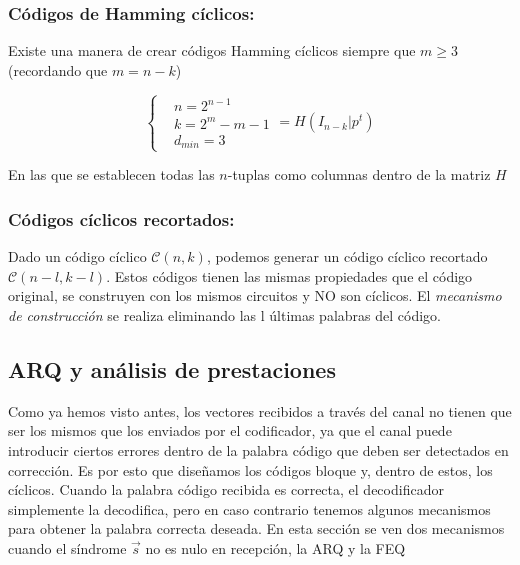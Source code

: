 \documentclass{article}
\begin{document}
\subsubsection{Códigos de Hamming cíclicos:}

Existe una manera de crear códigos Hamming cíclicos siempre que $m \geq 3$ (recordando que $m = n-k$) 

\begin{equation}
    \left\{
    \begin{aligned}
        &n=2^{n-1}\\
        &k=2^{m}-m-1\\
        &d_{min} = 3
    \end{aligned} 
    \right.
    = H(I_{n-k}|p^t)
\end{equation}

En las que se establecen todas las $n$-tuplas como columnas dentro de la matriz $H$

\pagebreak

\subsubsection{Códigos cíclicos recortados:}

Dado un código cíclico $\mathcal{C}(n,k)$, podemos generar un código cíclico recortado $\mathcal{C}(n-l, k-l)$. Estos códigos tienen las mismas propiedades que el código original, se construyen con los mismos circuitos y NO son cíclicos. El \textit{mecanismo de construcción} se realiza eliminando las l últimas palabras del código.

\subsection{ARQ y análisis de prestaciones}

Como ya hemos visto antes, los vectores recibidos a través del canal no tienen que ser los mismos que los enviados por el codificador, ya que el canal puede introducir ciertos errores dentro de la palabra código que deben ser detectados en corrección. Es por esto que diseñamos los códigos bloque y, dentro de estos, los cíclicos. Cuando la palabra código recibida es correcta, el decodificador simplemente la decodifica, pero en caso contrario tenemos algunos mecanismos para obtener la palabra correcta deseada. En esta sección se ven dos mecanismos cuando el síndrome $\vec{s}$ no es nulo en recepción, la ARQ y la FEQ
\end{document}
